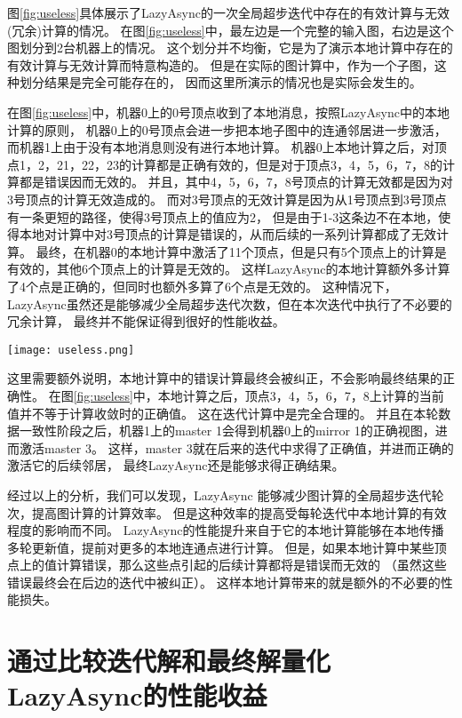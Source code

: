 图\ref{fig:useless}具体展示了LazyAsync的一次全局超步迭代中存在的有效计算与无效(冗余)计算的情况。
在图\ref{fig:useless}中，最左边是一个完整的输入图，右边是这个图划分到2台机器上的情况。
这个划分并不均衡，它是为了演示本地计算中存在的有效计算与无效计算而特意构造的。
但是在实际的图计算中，作为一个子图，这种划分结果是完全可能存在的，
因而这里所演示的情况也是实际会发生的。

在图\ref{fig:useless}中，机器0上的0号顶点收到了本地消息，按照LazyAsync中的本地计算的原则，
机器0上的0号顶点会进一步把本地子图中的连通邻居进一步激活，而机器1上由于没有本地消息则没有进行本地计算。
机器0上本地计算之后，对顶点1，2，21，22，23的计算都是正确有效的，但是对于顶点3，4，5，6，7，8的计算都是错误因而无效的。
并且，其中4，5，6，7，8号顶点的计算无效都是因为对3号顶点的计算无效造成的。
而对3号顶点的无效计算是因为从1号顶点到3号顶点有一条更短的路径，使得3号顶点上的值应为2，
但是由于1-3这条边不在本地，使得本地对计算中对3号顶点的计算是错误的，从而后续的一系列计算都成了无效计算。
最终，在机器0的本地计算中激活了11个顶点，但是只有5个顶点上的计算是有效的，其他6个顶点上的计算是无效的。
这样LazyAsync的本地计算额外多计算了4个点是正确的，但同时也额外多算了6个点是无效的。
这种情况下，LazyAsync虽然还是能够减少全局超步迭代次数，但在本次迭代中执行了不必要的冗余计算，
最终并不能保证得到很好的性能收益。

\begin{center}
  \texttt{[image: useless.png]}
  \label{fig:useless}
\end{center}  

这里需要额外说明，本地计算中的错误计算最终会被纠正，不会影响最终结果的正确性。
在图\ref{fig:useless}中，本地计算之后，顶点3，4，5，6，7，8上计算的当前值并不等于计算收敛时的正确值。
这在迭代计算中是完全合理的。
并且在本轮数据一致性阶段之后，机器1上的master 1会得到机器0上的mirror 1的正确视图，进而激活master 3。
这样，master 3就在后来的迭代中求得了正确值，并进而正确的激活它的后续邻居，
最终LazyAsync还是能够求得正确结果。

经过以上的分析，我们可以发现，LazyAsync 能够减少图计算的全局超步迭代轮次，提高图计算的计算效率。
但是这种效率的提高受每轮迭代中本地计算的有效程度的影响而不同。
LazyAsync的性能提升来自于它的本地计算能够在本地传播多轮更新值，提前对更多的本地连通点进行计算。
但是，如果本地计算中某些顶点上的值计算错误，那么这些点引起的后续计算都将是错误而无效的
（虽然这些错误最终会在后边的迭代中被纠正）。
这样本地计算带来的就是额外的不必要的性能损失。


\section{通过比较迭代解和最终解量化LazyAsync的性能收益}  

